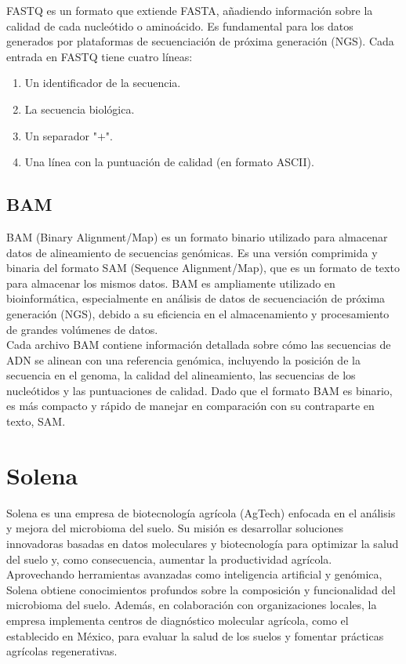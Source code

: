 FASTQ es un formato que extiende FASTA, añadiendo información sobre la calidad de cada nucleótido o aminoácido. Es fundamental para los datos generados por plataformas de secuenciación de próxima generación (NGS). Cada entrada en FASTQ tiene cuatro líneas:
\begin{enumerate}
\item Un identificador de la secuencia.
\item La secuencia biológica.
\item Un separador "$+$".
\item Una línea con la puntuación de calidad (en formato ASCII).
\end{enumerate}

\subsection{BAM}
BAM (Binary Alignment/Map) es un formato binario utilizado para almacenar datos de alineamiento de secuencias genómicas. Es una versión comprimida y binaria del formato SAM (Sequence Alignment/Map), que es un formato de texto para almacenar los mismos datos. BAM es ampliamente utilizado en bioinformática, especialmente en análisis de datos de secuenciación de próxima generación (NGS), debido a su eficiencia en el almacenamiento y procesamiento de grandes volúmenes de datos.\\

Cada archivo BAM contiene información detallada sobre cómo las secuencias de ADN se alinean con una referencia genómica, incluyendo la posición de la secuencia en el genoma, la calidad del alineamiento, las secuencias de los nucleótidos y las puntuaciones de calidad. Dado que el formato BAM es binario, es más compacto y rápido de manejar en comparación con su contraparte en texto, SAM.\\

\section{Solena}
Solena es una empresa de biotecnología agrícola (AgTech) enfocada en el análisis y mejora del microbioma del suelo. Su misión es desarrollar soluciones innovadoras basadas en datos moleculares y biotecnología para optimizar la salud del suelo y, como consecuencia, aumentar la productividad agrícola. Aprovechando herramientas avanzadas como inteligencia artificial y genómica, Solena obtiene conocimientos profundos sobre la composición y funcionalidad del microbioma del suelo. Además, en colaboración con organizaciones locales, la empresa implementa centros de diagnóstico molecular agrícola, como el establecido en México, para evaluar la salud de los suelos y fomentar prácticas agrícolas regenerativas.




